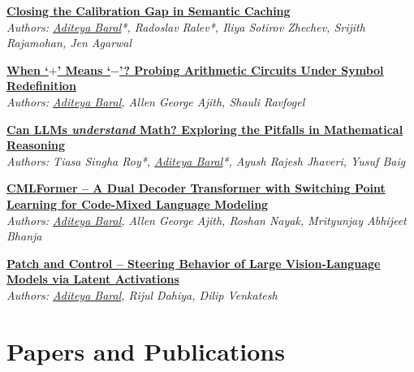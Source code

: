 \documentclass[letterpaper, 11pt]{article}
\begin{document}
	\begin{enumerate}[label={[\arabic{*}]}]
		\item \textbf{\href{https://arxiv.org/abs/2606.19719}{Closing the
			Calibration Gap in Semantic Caching}} \\ \textit{Authors: \underline{Aditeya Baral}*,
			Radoslav Ralev*, Iliya Sotirov Zhechev, Srijith Rajamohan, Jen Agarwal}

		\item \textbf{\href{https://aditeyabaral.com/assets/pdf/When_+_Means_-_poster.pdf}{When
			`$+$' Means `$-$'? Probing Arithmetic Circuits Under Symbol Redefinition}}
			\\ \textit{Authors: \underline{Aditeya Baral}, Allen George Ajith, Shauli
			Ravfogel}

		\item \textbf{\href{https://arxiv.org/abs/2505.15623}{Can LLMs \textit{understand}
			Math? Exploring the Pitfalls in Mathematical Reasoning}} \\ \textit{Authors:
			Tiasa Singha Roy*, \underline{Aditeya Baral}*, Ayush Rajesh Jhaveri, Yusuf
			Baig}

		\item \textbf{\href{https://arxiv.org/abs/2505.12587}{CMLFormer -- A Dual Decoder
			Transformer with Switching Point Learning for Code-Mixed Language Modeling}}
			\\ \textit{Authors: \underline{Aditeya Baral}, Allen George Ajith, Roshan
			Nayak, Mrityunjay Abhijeet Bhanja}

		\item \textbf{\href{https://aditeyabaral.com/assets/pdf/Patch_and_Control__Steering_Behavior_of_Large_Vision_Language_Models_via_Latent_Activations.pdf}{Patch
			and Control -- Steering Behavior of Large Vision-Language Models via Latent
			Activations}} \\ \textit{Authors: \underline{Aditeya Baral}, Rijul Dahiya,
			Dilip Venkatesh}
	\end{enumerate}

	\section{Papers and Publications}
\end{document}
